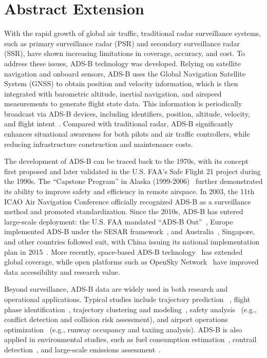 \section{Abstract Extension}

With the rapid growth of global air traffic, traditional radar surveillance systems, such as primary surveillance radar (PSR) and secondary surveillance radar (SSR), have shown increasing limitations in coverage, accuracy, and cost. To address these issues, ADS-B technology was developed. Relying on satellite navigation and onboard sensors, ADS-B uses the Global Navigation Satellite System (GNSS) to obtain position and velocity information, which is then integrated with barometric altitude, inertial navigation, and airspeed measurements to generate flight state data. This information is periodically broadcast via ADS-B devices, including identifiers, position, altitude, velocity, and flight intent~\cite{olive2024filtering}. Compared with traditional radar, ADS-B significantly enhances situational awareness for both pilots and air traffic controllers, while reducing infrastructure construction and maintenance costs.

The development of ADS-B can be traced back to the 1970s, with its concept first proposed and later validated in the U.S. FAA’s Safe Flight 21 project during the 1990s. The “Capstone Program” in Alaska (1999-2006)~\cite{faa2000capstone} further demonstrated its ability to improve safety and efficiency in remote airspace. In 2003, the 11th ICAO Air Navigation Conference officially recognized ADS-B as a surveillance method and promoted standardization. Since the 2010s, ADS-B has entered large-scale deployment: the U.S. FAA mandated “ADS-B Out”~\cite{cfr91-225}, Europe implemented ADS-B under the SESAR framework~\cite{undertaking2009european}, and Australia~\cite{casa2010cao20-18}, Singapore, and other countries followed suit, with China issuing its national implementation plan in 2015~\cite{caac2015adsb}. More recently, space-based ADS-B technology~\cite{melero2024satera} has extended global coverage, while open platforms such as OpenSky Network~\cite{schafer2014bringing} have improved data accessibility and research value.

Beyond surveillance, ADS-B data are widely used in both research and operational applications. Typical studies include trajectory prediction ~\cite{wang2017short}\cite {yoon2023improving}, flight phase identification~\cite{wang2021performance}, trajectory clustering and modeling~\cite{corrado2021clustering}, safety analysis~\cite{schlosser2024analysis} (e.g., conflict detection and collision risk assessment), and airport operations optimization~\cite{guleriamachine} (e.g., runway occupancy and taxiing analysis). ADS-B is also applied in environmental studies, such as fuel consumption estimation~\cite{noh2018aviation}, contrail detection~\cite{roosenbrand2023contrail}, and large-scale emissions assessment~\cite{sun2023evaluating}.


